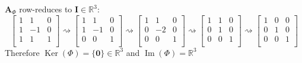 \documentclass[11pt]{article}
\newcommand{\R}{\mathbb{R}}
\newcommand{\mat}[1]{\mathbf{#1}}   %
\newcommand{\vect}[1]{\bm{#1}}      %
\DeclareMathOperator{\Ker}{Ker}
\DeclareMathOperator{\Img}{Im}
\theoremstyle{definition}
\theoremstyle{plain}
\theoremstyle{remark}
\begin{document}
\begin{enumerate}
\begin{enumerate}
                    $\mat{A}_\Phi$ row-reduces to $\mat{I} \in \R^3$:
                    \[
                        \begin{bmatrix}
                            1 & 1  & 0 \\
                            1 & -1 & 0 \\
                            1 & 1  & 1 \\
                        \end{bmatrix}
                        \rightsquigarrow
                        \begin{bmatrix}
                            1 & 1  & 0 \\
                            1 & -1 & 0 \\
                            0 & 0  & 1 \\
                        \end{bmatrix}
                        \rightsquigarrow
                        \begin{bmatrix}
                            1 & 1  & 0 \\
                            0 & -2 & 0 \\
                            0 & 0  & 1 \\
                        \end{bmatrix}
                        \rightsquigarrow
                        \begin{bmatrix}
                            1 & 1 & 0 \\
                            0 & 1 & 0 \\
                            0 & 0 & 1 \\
                        \end{bmatrix}
                        \rightsquigarrow
                        \begin{bmatrix}
                            1 & 0 & 0 \\
                            0 & 1 & 0 \\
                            0 & 0 & 1 \\
                        \end{bmatrix}
                    \]
                    Therefore $\Ker(\Phi) = \{ \vect{0} \} \in \R^3$ and $\Img(\Phi) = \R^3$


\end{enumerate}
\end{enumerate}
\end{document}
